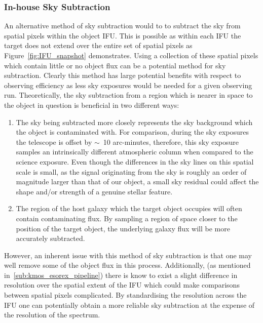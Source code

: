 \subsubsection{In-house Sky Subtraction} %
\label{sub:in_house_sky_subtraction}

An alternative method of sky subtraction would to to subtract the sky from spatial pixels within the object IFU.
This is possible as within each IFU the target does not extend over the entire set of spatial pixels as Figure~\ref{fig:IFU_snapshot} demonstrates.
Using a collection of these spatial pixels which contain little or no object flux can be a potential method for sky subtraction.
Clearly this method has large potential benefits with respect to observing efficiency as less sky exposures would be needed for a given observing run.
Theoretically, the sky subtraction from a region which is nearer in space to the object in question is beneficial in two different ways:
\begin{enumerate}
  \item The sky being subtracted more closely represents the sky background which the object is contaminated with.
For comparison, during the sky exposures the telescope is offset by $\sim$~10 arc-minutes, therefore, this sky exposure samples an intrinsically different atmospheric column when compared to the science exposure.
Even though the differences in the sky lines on this spatial scale is small, as the signal originating from the sky is roughly an order of magnitude larger than that of our object, a small sky residual could affect the shape and/or strength of a genuine stellar feature.
\item The region of the host galaxy which the target object occupies will often contain contaminating flux.
By sampling a region of space closer to the position of the target object, the underlying galaxy flux will be more accurately subtracted.
\end{enumerate}

However, an inherent issue with this method of sky subtraction is that one may well remove some of the object flux in this process.
Additionally, (as mentioned in~\ref{sub:kmos_esorex_pipeline}) there is know to exist a slight difference in resolution over the spatial extent of the IFU which could make comparisons between spatial pixels complicated.
By standardising the resolution across the IFU one can potentially obtain a more reliable sky subtraction at the expense of the resolution of the spectrum.


